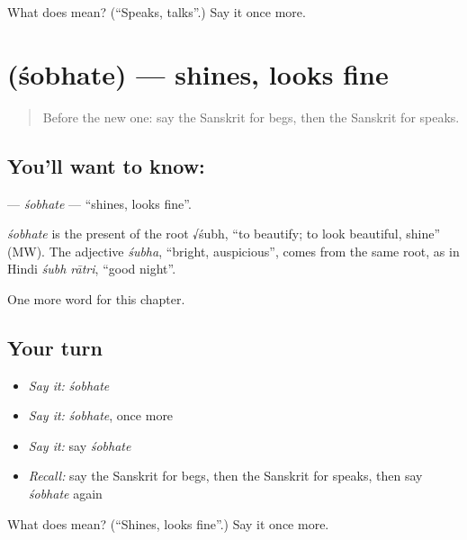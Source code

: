 \begin{tcolorbox}[breakable,colback=teal!4,colframe=teal!35!black,title={Before you move on}]
What does  mean? (\textquotedblleft{}Speaks, talks\textquotedblright{}.) Say it once more.
\end{tcolorbox}
\section[\texorpdfstring{\sk{शोभते} (śobhate)}{शोभते (śobhate)}]{ (śobhate) — shines, looks fine}

\label{lesson:SA-C203-sobhate}



\begin{quote}
Before the new one: say the Sanskrit for begs, then the Sanskrit for speaks.
\end{quote}

\subsection*{You'll want to know: }
\textbf{} — \emph{śobhate} — \textquotedblleft{}shines, looks fine\textquotedblright{}.

\begin{cousinweb}
\emph{śobhate} is the present of the root √śubh, \textquotedblleft{}to beautify; to look beautiful, shine\textquotedblright{} (MW). The adjective \emph{śubha}, \textquotedblleft{}bright, auspicious\textquotedblright{}, comes from the same root, as in Hindi \emph{śubh rātri}, \textquotedblleft{}good night\textquotedblright{}.
\end{cousinweb}

\begin{grammarlens}[title={What you've built}]
One more word for this chapter.
\end{grammarlens}

\subsection*{Your turn}
\begin{itemize}
\raggedright
  \item \emph{Say it:} \emph{śobhate}
  \item \emph{Say it:} \emph{śobhate}, once more
  \item \emph{Say it:} say \emph{śobhate}
  \item \emph{Recall:} say the Sanskrit for begs, then the Sanskrit for speaks, then say \emph{śobhate} again
\end{itemize}

\begin{tcolorbox}[breakable,colback=teal!4,colframe=teal!35!black,title={Before you move on}]
What does  mean? (\textquotedblleft{}Shines, looks fine\textquotedblright{}.) Say it once more.
\end{tcolorbox}
